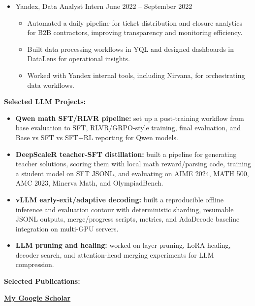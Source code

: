 \documentclass[a4paper, fontsize=11pt]{article}
\begin{document}
\begin{itemize}
\begin{itemize}
    \end{itemize}

    \item Yandex, Data Analyst Intern \hfill June 2022 -- September 2022
    \begin{itemize}
        \item Automated a daily pipeline for ticket distribution and closure analytics for B2B contractors, improving transparency and monitoring efficiency.
        \item Built data processing workflows in YQL and designed dashboards in DataLens for operational insights.
        \item Worked with Yandex internal tools, including Nirvana, for orchestrating data workflows.
    \end{itemize}
\end{itemize}

\textbf{Selected LLM Projects:}
\begin{itemize}
    \item \textbf{Qwen math SFT/RLVR pipeline:} set up a post-training workflow from base evaluation to SFT, RLVR/GRPO-style training, final evaluation, and Base vs SFT vs SFT+RL reporting for Qwen models.
    \item \textbf{DeepScaleR teacher-SFT distillation:} built a pipeline for generating teacher solutions, scoring them with local math reward/parsing code, training a student model on SFT JSONL, and evaluating on AIME 2024, MATH 500, AMC 2023, Minerva Math, and OlympiadBench.
    \item \textbf{vLLM early-exit/adaptive decoding:} built a reproducible offline inference and evaluation contour with deterministic sharding, resumable JSONL outputs, merge/progress scripts, metrics, and AdaDecode baseline integration on multi-GPU servers.
    \item \textbf{LLM pruning and healing:} worked on layer pruning, LoRA healing, decoder search, and attention-head merging experiments for LLM compression.
\end{itemize}


\textbf{Selected Publications:}

\textbf{\href{https://scholar.google.com/citations?hl=ru&pli=1&user=YXllYbsAAAAJ}{My Google Scholar}}
\end{document}
